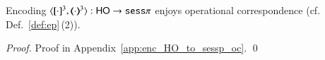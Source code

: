 \begin{comment}
	
	\item Case $P = \appl{X}{k}$. Also here we have two cases, depending on whether $X$ has linear or shared type.
	In the first case, $X$ is linear and
	we have the following typing in the source language:
	{\small
	\[
			\tree{\Gamma ;\, \{X : \lhot{S_1}\};\,  \es \proves  X \hastype \lhot{S_1} \quad \Gamma; \es ; \{k:S_1\} \proves k \hastype S_1
			}{
			\Gamma;\, \{X : \lhot{S_1}\};\, k:S_1 \proves  \appl{X}{k} \hastype \Proc}
	\]
	}
	The corresponding typing in the target language is as follows  --- below we write $\tmap{\Gamma_1}{3}$ to stand for $\tmap{\Gamma}{3} \cat x:\chtype{\btout{\tmap{S_1}{3}}\tinact}$:
		{\small
	\[
			\tree{
			\tree{
			\tree{
			\tree{
			\tmap{\Gamma_1}{3};\, \es;\,  \es \proves  \inact \hastype \Proc
			}{
			\tmap{\Gamma_1}{3};\, \es;\,  \dual{s}:\tinact \proves  \inact \hastype \Proc
			} \quad 
			\tree{
			}{
			\tmap{\Gamma_1}{3};\, \es;\, \{k:\tmap{S_1}{3}\} \proves  k \hastype \tmap{S_1}{3} 
			}
			}{
			\tmap{\Gamma_1}{3};\, \es;\,\, k:\tmap{S_1}{3},\,  \dual{s}:\btout{\tmap{S_1}{3}}\tinact \proves  \bout{\dual{s}}{k}\inact \hastype \Proc
			} \quad \tree{}{\tmap{\Gamma_1}{3} ;\, \es ;\, \es \proves x \hastype \chtype{\btout{\tmap{S_1}{3}}\tinact}}
			}{
			\tmap{\Gamma_1}{3};\, \es;\, k:\tmap{S_1}{3}, s:\btinp{\tmap{S_1}{3}}\tinact , \dual{s}:\btout{\tmap{S_1}{3}}\tinact \proves  \bout{x}{s}\bout{\dual{s}}{k}\inact \hastype \Proc
			}
			}{
			\tmap{\Gamma_1}{3};\, \es;\, k:\tmap{S_1}{3} \proves  \news{s}{(\bout{x}{s}\bout{\dual{s}}{k}\inact)} \hastype \Proc}
	\]
	}
	In the second case, $X$ is shared, and
	we have the following typing in the source language:
	{\small
	\[
			\tree{\Gamma \cat  X : \lhot{S_1} ;\,  \es ;\,  \es \proves  X \hastype \shot{S_1} \quad \Gamma; \es ; k:S_1 \proves k \hastype S_1
			}{
			\Gamma \cat X : \shot{S_1};\, \es ;\, k:S_1 \proves  \appl{X}{k} \hastype \Proc}
	\]
	}
	The associated typing in the target language is obtained similarly as in the first case. \qed
	\end{enumerate}
	\end{proof}
\end{comment}


\begin{proposition}\rm
	Encoding $\encod{\cdot}{\cdot}{3}: \HO \to \sesp$ 
	enjoys operational correspondence (cf. Def.~\ref{def:ep}\,(2)).
\end{proposition}

\begin{proof}
	Proof in Appendix~\ref{app:enc_HO_to_sessp_oc}.
	\qed
\end{proof}

